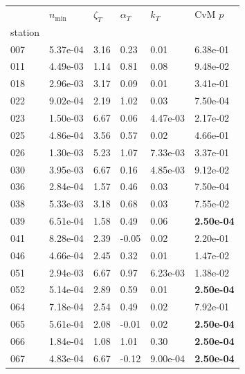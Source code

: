 \begin{figure}[htbp!]
    \centering
    {\footnotesize
    \begin{minipage}[t]{0.48\linewidth}
        \centering
        \begin{tabular}{llllll}
        \toprule
         & $n_{\min}$ & $\zeta_T$ & $\alpha_T$ & $k_T$ & CvM $p$ \\
        station &  &  &  &  &  \\
        \midrule
                    007 & 5.37e-04 & 3.16 & 0.23 & 0.01 & 6.38e-01\\
                    011 & 4.49e-03 & 1.14 & 0.81 & 0.08 & 9.48e-02\\
                    018 & 2.96e-03 & 3.17 & 0.09 & 0.01 & 3.41e-01\\
                    022 & 9.02e-04 & 2.19 & 1.02 & 0.03 & 7.50e-04\\
                    023 & 1.50e-03 & 6.67 & 0.06 & 4.47e-03 & 2.17e-02\\
                    025 & 4.86e-04 & 3.56 & 0.57 & 0.02 & 4.66e-01\\
                    026 & 1.30e-03 & 5.23 & 1.07 & 7.33e-03 & 3.37e-01\\
                    030 & 3.95e-03 & 6.67 & 0.16 & 4.85e-03 & 9.12e-02\\
                    036 & 2.84e-04 & 1.57 & 0.46 & 0.03 & 7.50e-04\\
                    038 & 5.33e-03 & 3.18 & 0.68 & 0.03 & 7.55e-02\\
                    039 & 6.51e-04 & 1.58 & 0.49 & 0.06 & \textbf{2.50e-04}\\
                    041 & 8.28e-04 & 2.39 & -0.05 & 0.02 & 2.20e-01\\
                    046 & 4.66e-04 & 2.45 & 0.32 & 0.01 & 1.47e-02\\
                    051 & 2.94e-03 & 6.67 & 0.97 & 6.23e-03 & 1.38e-02\\
                    052 & 5.14e-04 & 2.89 & 0.59 & 0.01 & \textbf{2.50e-04}\\
                    064 & 7.18e-04 & 2.54 & 0.49 & 0.02 & 7.92e-01\\
                    065 & 5.61e-04 & 2.08 & -0.01 & 0.02 & \textbf{2.50e-04}\\
                    066 & 1.84e-04 & 1.08 & 1.01 & 0.30 & \textbf{2.50e-04}\\
                    067 & 4.83e-04 & 6.67 & -0.12 & 9.00e-04 & \textbf{2.50e-04}\\

\end{tabular}
\end{minipage}}
\end{figure}
